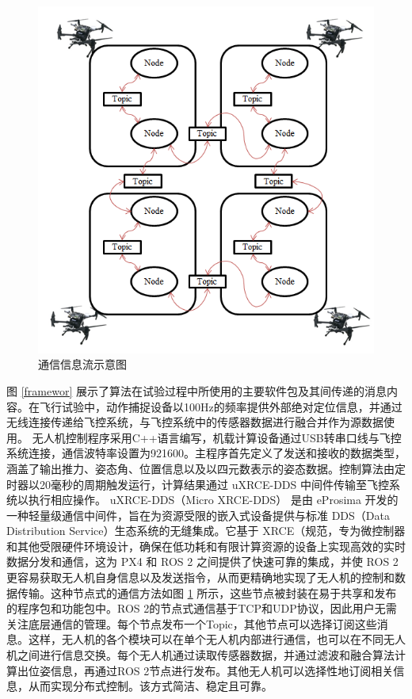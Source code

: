 \documentclass[lang=chs, degree=master, blindreview=false, winfonts=true]{yanputhesis}
\begin{document}
\begin{figure}[hbt!]
	\centering
	\includegraphics[width=27pc]{picture/ros.png} 
	\caption{通信信息流示意图} 
	\label{ros}
\end{figure}
图 \ref{framewor} 展示了算法在试验过程中所使用的主要软件包及其间传递的消息内容。在飞行试验中，动作捕捉设备以100Hz的频率提供外部绝对定位信息，并通过无线连接传递给飞控系统，与飞控系统中的传感器数据进行融合并作为源数据使用。
无人机控制程序采用C++语言编写，机载计算设备通过USB转串口线与飞控系统连接，通信波特率设置为921600。主程序首先定义了发送和接收的数据类型，涵盖了输出推力、姿态角、位置信息以及以四元数表示的姿态数据。控制算法由定时器以20毫秒的周期触发运行，计算结果通过 uXRCE-DDS 中间件传输至飞控系统以执行相应操作。
uXRCE-DDS（Micro XRCE-DDS） 是由 eProsima 开发的一种轻量级通信中间件，旨在为资源受限的嵌入式设备提供与标准 DDS（Data Distribution Service）生态系统的无缝集成。它基于 XRCE（规范，专为微控制器和其他受限硬件环境设计，确保在低功耗和有限计算资源的设备上实现高效的实时数据分发和通信，这为 PX4 和 ROS 2 之间提供了快速可靠的集成，并使 ROS 2 更容易获取无人机自身信息以及发送指令，从而更精确地实现了无人机的控制和数据传输。这种节点式的通信方法如图 \ref{ros} 所示，这些节点被封装在易于共享和发布的程序包和功能包中。ROS 2的节点式通信基于TCP和UDP协议，因此用户无需关注底层通信的管理。每个节点发布一个Topic，其他节点可以选择订阅这些消息。这样，无人机的各个模块可以在单个无人机内部进行通信，也可以在不同无人机之间进行信息交换。每个无人机通过读取传感器数据，并通过滤波和融合算法计算出位姿信息，再通过ROS 2节点进行发布。其他无人机可以选择性地订阅相关信息，从而实现分布式控制。该方式简洁、稳定且可靠。
\end{document}
